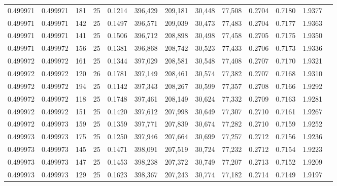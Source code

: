 \begin{tabular}{rrrrrrrrrrrrr}
0.499971 & 0.499971 &   181 &  25 &                                     0.1214 & 396,429 & 209,181 &  30,448 &  77,508 & 0.2704 & 0.7180 & 1.9377 \\
0.499971 & 0.499971 &   142 &  25 &                                     0.1497 & 396,571 & 209,039 &  30,473 &  77,483 & 0.2704 & 0.7177 & 1.9363 \\
0.499971 & 0.499971 &   141 &  25 &                                     0.1506 & 396,712 & 208,898 &  30,498 &  77,458 & 0.2705 & 0.7175 & 1.9350 \\
0.499971 & 0.499972 &   156 &  25 &                                     0.1381 & 396,868 & 208,742 &  30,523 &  77,433 & 0.2706 & 0.7173 & 1.9336 \\
0.499972 & 0.499972 &   161 &  25 &                                     0.1344 & 397,029 & 208,581 &  30,548 &  77,408 & 0.2707 & 0.7170 & 1.9321 \\
0.499972 & 0.499972 &   120 &  26 &                                     0.1781 & 397,149 & 208,461 &  30,574 &  77,382 & 0.2707 & 0.7168 & 1.9310 \\
0.499972 & 0.499972 &   194 &  25 &                                     0.1142 & 397,343 & 208,267 &  30,599 &  77,357 & 0.2708 & 0.7166 & 1.9292 \\
0.499972 & 0.499972 &   118 &  25 &                                     0.1748 & 397,461 & 208,149 &  30,624 &  77,332 & 0.2709 & 0.7163 & 1.9281 \\
0.499972 & 0.499972 &   151 &  25 &                                     0.1420 & 397,612 & 207,998 &  30,649 &  77,307 & 0.2710 & 0.7161 & 1.9267 \\
0.499972 & 0.499973 &   159 &  25 &                                     0.1359 & 397,771 & 207,839 &  30,674 &  77,282 & 0.2710 & 0.7159 & 1.9252 \\
0.499973 & 0.499973 &   175 &  25 &                                     0.1250 & 397,946 & 207,664 &  30,699 &  77,257 & 0.2712 & 0.7156 & 1.9236 \\
0.499973 & 0.499973 &   145 &  25 &                                     0.1471 & 398,091 & 207,519 &  30,724 &  77,232 & 0.2712 & 0.7154 & 1.9223 \\
0.499973 & 0.499973 &   147 &  25 &                                     0.1453 & 398,238 & 207,372 &  30,749 &  77,207 & 0.2713 & 0.7152 & 1.9209 \\
0.499973 & 0.499973 &   129 &  25 &                                     0.1623 & 398,367 & 207,243 &  30,774 &  77,182 & 0.2714 & 0.7149 & 1.9197 \\

\end{tabular}
